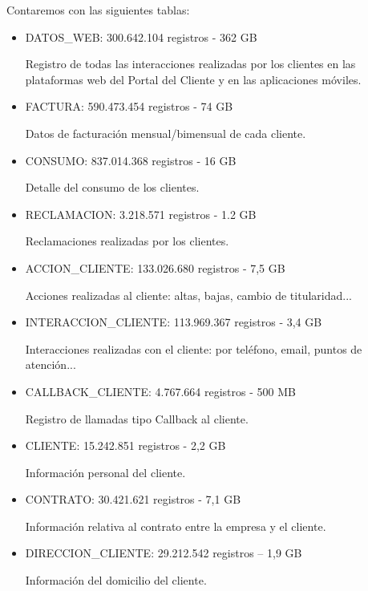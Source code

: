Contaremos con las siguientes tablas: 

\begin{itemize}
    \item DATOS\_WEB: 300.642.104 registros - 362 GB 

    Registro de todas las interacciones realizadas por los clientes en las plataformas web del Portal del Cliente y en las aplicaciones móviles. 

    \item FACTURA: 590.473.454 registros - 74 GB 

    Datos de facturación mensual/bimensual de cada cliente. 

    \item CONSUMO: 837.014.368 registros - 16 GB 

    Detalle del consumo de los clientes. 

    \item RECLAMACION: 3.218.571 registros - 1.2 GB 

    Reclamaciones realizadas por los clientes. 

    \item ACCION\_CLIENTE: 133.026.680 registros - 7,5 GB 

    Acciones realizadas al cliente: altas, bajas, cambio de titularidad... 

    \item INTERACCION\_CLIENTE: 113.969.367 registros - 3,4 GB 

    Interacciones realizadas con el cliente: por teléfono, email, puntos de atención... 

    \item CALLBACK\_CLIENTE: 4.767.664 registros - 500 MB 

    Registro de llamadas tipo Callback al cliente. 

    \item CLIENTE: 15.242.851 registros - 2,2 GB 

    Información personal del cliente. 

    \item CONTRATO: 30.421.621 registros - 7,1 GB 

    Información relativa al contrato entre la empresa y el cliente. 

    \item DIRECCION\_CLIENTE: 29.212.542 registros – 1,9 GB 

    Información del domicilio del cliente. 
\end{itemize}
